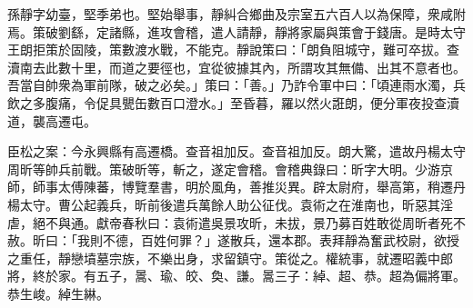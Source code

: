 
\begin{pinyinscope}
孫靜字幼臺，堅季弟也。堅始舉事，靜糾合鄉曲及宗室五六百人以為保障，衆咸附焉。策破劉繇，定諸縣，進攻會稽，遣人請靜，靜將家屬與策會于錢唐。是時太守王朗拒策於固陵，策數渡水戰，不能克。靜說策曰：「朗負阻城守，難可卒拔。查瀆南去此數十里，而道之要徑也，宜從彼據其內，所謂攻其無備、出其不意者也。吾當自帥衆為軍前隊，破之必矣。」策曰：「善。」乃詐令軍中曰：「頃連雨水濁，兵飲之多腹痛，令促具甖缶數百口澄水。」至昏暮，羅以然火誑朗，便分軍夜投查瀆道，襲高遷屯。

臣松之案：今永興縣有高遷橋。查音祖加反。查音祖加反。朗大驚，遣故丹楊太守周昕等帥兵前戰。策破昕等，斬之，遂定會稽。會稽典錄曰：昕字大明。少游京師，師事太傅陳蕃，博覽羣書，明於風角，善推災異。辟太尉府，舉高第，稍遷丹楊太守。曹公起義兵，昕前後遣兵萬餘人助公征伐。袁術之在淮南也，昕惡其淫虐，絕不與通。獻帝春秋曰：袁術遣吳景攻昕，未拔，景乃募百姓敢從周昕者死不赦。昕曰：「我則不德，百姓何罪？」遂散兵，還本郡。表拜靜為奮武校尉，欲授之重任，靜戀墳墓宗族，不樂出身，求留鎮守。策從之。權統事，就遷昭義中郎將，終於家。有五子，暠、瑜、皎、奐、謙。暠三子：綽、超、恭。超為偏將軍。恭生峻。綽生綝。


\end{pinyinscope}